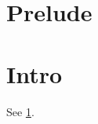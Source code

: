 \documentclass[twocolumn,unicode]{wrapper}
\begin{document}
\wrapperclass\articleclass\layoutmode\hypermode
\tableofcontents
\section*{Prelude}
{}
\section{Intro}\label{sec:intro}
See \ref{sec:intro}.
\end{document}
